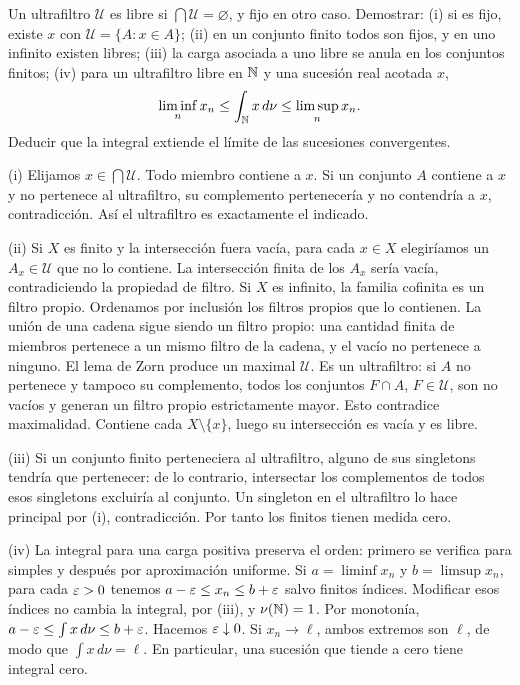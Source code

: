 \begin{ejercicio}\label{ej:v2-l29-5}
Un ultrafiltro $\mathcal U$ es libre si $\bigcap\mathcal U=\varnothing$, y fijo en otro caso. Demostrar: (i) si es fijo, existe $x$ con $\mathcal U=\{A:x\in A\}$; (ii) en un conjunto finito todos son fijos, y en uno infinito existen libres; (iii) la carga asociada a uno libre se anula en los conjuntos finitos; (iv) para un ultrafiltro libre en $\mathbb N$ y una sucesión real acotada $x$,
\[
 \liminf_nx_n\le\int_\mathbb N x\,d\nu\le\limsup_nx_n.
\]
Deducir que la integral extiende el límite de las sucesiones convergentes.
\end{ejercicio}
\begin{solucion}
(i) Elijamos $x\in\bigcap\mathcal U$. Todo miembro contiene a $x$. Si un conjunto $A$ contiene a $x$ y no pertenece al ultrafiltro, su complemento pertenecería y no contendría a $x$, contradicción. Así el ultrafiltro es exactamente el indicado.

(ii) Si $X$ es finito y la intersección fuera vacía, para cada $x\in X$ elegiríamos un $A_x\in\mathcal U$ que no lo contiene. La intersección finita de los $A_x$ sería vacía, contradiciendo la propiedad de filtro. Si $X$ es infinito, la familia cofinita es un filtro propio. Ordenamos por inclusión los filtros propios que lo contienen. La unión de una cadena sigue siendo un filtro propio: una cantidad finita de miembros pertenece a un mismo filtro de la cadena, y el vacío no pertenece a ninguno. El lema de Zorn produce un maximal $\mathcal U$. Es un ultrafiltro: si $A$ no pertenece y tampoco su complemento, todos los conjuntos $F\cap A$, $F\in\mathcal U$, son no vacíos y generan un filtro propio estrictamente mayor. Esto contradice maximalidad. Contiene cada $X\setminus\{x\}$, luego su intersección es vacía y es libre.

(iii) Si un conjunto finito perteneciera al ultrafiltro, alguno de sus singletons tendría que pertenecer: de lo contrario, intersectar los complementos de todos esos singletons excluiría al conjunto. Un singleton en el ultrafiltro lo hace principal por (i), contradicción. Por tanto los finitos tienen medida cero.

(iv) La integral para una carga positiva preserva el orden: primero se verifica para simples y después por aproximación uniforme. Si $a=\liminf x_n$ y $b=\limsup x_n$, para cada $\varepsilon>0$ tenemos $a-\varepsilon\le x_n\le b+\varepsilon$ salvo finitos índices. Modificar esos índices no cambia la integral, por (iii), y $\nu(\mathbb N)=1$. Por monotonía, $a-\varepsilon\le\int x\,d\nu\le b+\varepsilon$. Hacemos $\varepsilon\downarrow0$. Si $x_n\to\ell$, ambos extremos son $\ell$, de modo que $\int x\,d\nu=\ell$. En particular, una sucesión que tiende a cero tiene integral cero.
\end{solucion}

